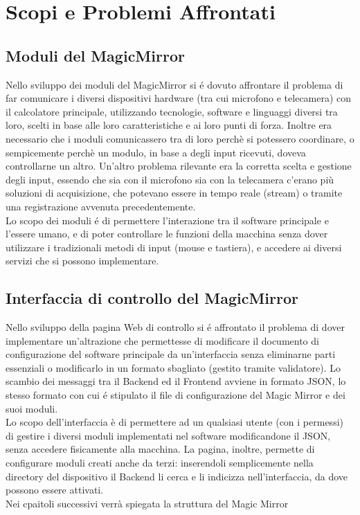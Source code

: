 \chapter{Scopi e Problemi Affrontati}

\section{Moduli del MagicMirror}
Nello sviluppo dei moduli del MagicMirror si \'e dovuto affrontare il problema di far comunicare
i diversi dispositivi hardware (tra cui microfono e telecamera) con il calcolatore principale, utilizzando tecnologie,
software e linguaggi diversi tra loro, scelti in base alle loro caratteristiche e ai loro punti di forza.
Inoltre era necessario che i moduli comunicassero tra di loro perchè si potessero coordinare, o sempicemente
perchè un modulo, in base a degli input ricevuti, doveva controllarne un altro.
Un'altro problema rilevante era la corretta scelta e gestione degli input, essendo che sia con il microfono sia
con la telecamera c'erano più soluzioni di acquisizione, che potevano essere in tempo reale (stream)
o tramite una registrazione avvenuta precedentemente.\\
Lo scopo dei moduli \'e di permettere l'interazione tra il software principale
e l'essere umano, e di poter controllare le funzioni della macchina senza dover utilizzare
i tradizionali metodi di input (mouse e tastiera), e accedere ai diversi servizi che si possono implementare.
\\[2\baselineskip]
\section{Interfaccia di controllo del MagicMirror}
Nello sviluppo della pagina Web di controllo si \'e affrontato il problema di dover
implementare un'altrazione che permettesse di modificare
il documento di configurazione del software principale da un'interfaccia senza eliminarne parti essenziali
o modificarlo in un formato sbagliato (gestito tramite validatore).
Lo scambio dei messaggi tra il Backend ed il Frontend avviene in formato JSON, lo stesso formato
con cui \'e stipulato il file di configurazione del Magic Mirror e dei suoi moduli.\\
Lo scopo dell'interfaccia è di permettere ad un qualsiasi utente (con i permessi) di gestire
i diversi moduli implementati nel software modificandone il JSON, senza accedere fisicamente alla macchina.
La pagina, inoltre, permette di configurare moduli creati anche da terzi: inserendoli
semplicemente nella directory del dispositivo il Backend li cerca e li indicizza nell'interfaccia,
da dove possono essere attivati.
\\[2\baselineskip]
Nei cpaitoli successivi verrà spiegata la struttura del Magic Mirror 
